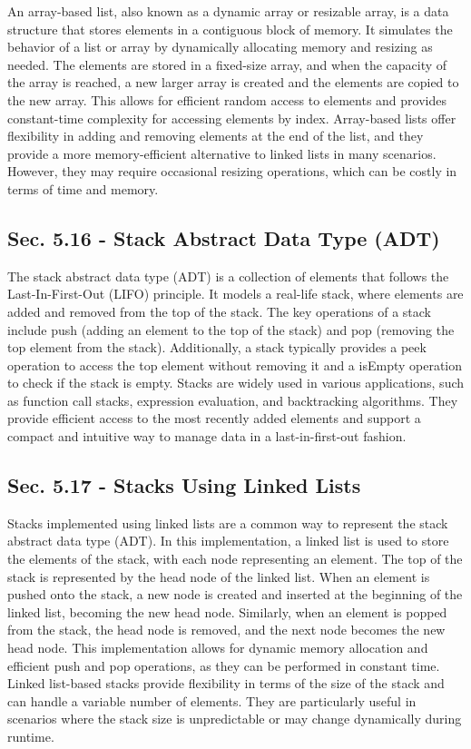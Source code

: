 An array-based list, also known as a dynamic array or resizable array, is a data structure that stores elements in a contiguous block of memory. It simulates the behavior of a list or array by dynamically allocating memory and resizing as needed. The elements are stored in a fixed-size array, and when the capacity of the array is reached, a new larger 
array is created and the elements are copied to the new array. This allows for efficient random access to elements and provides constant-time complexity for accessing elements by index. Array-based lists offer flexibility in adding and removing elements at the end of the list, and they provide a more memory-efficient alternative to linked lists in many 
scenarios. However, they may require occasional resizing operations, which can be costly in terms of time and memory.

\subsection*{Sec. 5.16 - Stack Abstract Data Type (ADT)}

The stack abstract data type (ADT) is a collection of elements that follows the Last-In-First-Out (LIFO) principle. It models a real-life stack, where elements are added and removed from the top of the stack. The key operations of a stack include push (adding an element to the top of the stack) and pop (removing the top element from the stack). Additionally, 
a stack typically provides a peek operation to access the top element without removing it and a isEmpty operation to check if the stack is empty. Stacks are widely used in various applications, such as function call stacks, expression evaluation, and backtracking algorithms. They provide efficient access to the most recently added elements and support a compact 
and intuitive way to manage data in a last-in-first-out fashion.

\subsection*{Sec. 5.17 - Stacks Using Linked Lists}

Stacks implemented using linked lists are a common way to represent the stack abstract data type (ADT). In this implementation, a linked list is used to store the elements of the stack, with each node representing an element. The top of the stack is represented by the head node of the linked list. When an element is pushed onto the stack, a new node is created 
and inserted at the beginning of the linked list, becoming the new head node. Similarly, when an element is popped from the stack, the head node is removed, and the next node becomes the new head node. This implementation allows for dynamic memory allocation and efficient push and pop operations, as they can be performed in constant time. Linked list-based stacks 
provide flexibility in terms of the size of the stack and can handle a variable number of elements. They are particularly useful in scenarios where the stack size is unpredictable or may change dynamically during runtime.


